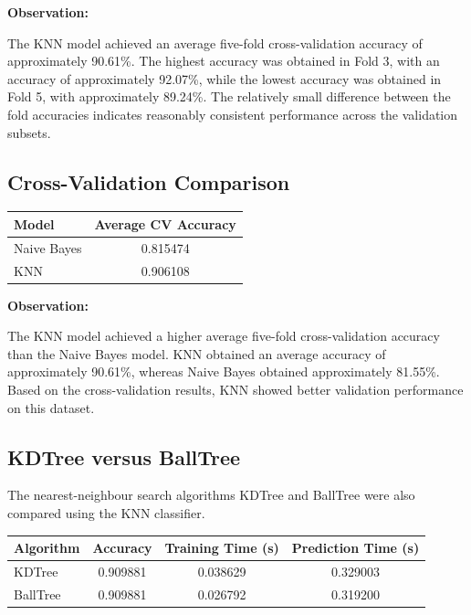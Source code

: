 \documentclass[12pt,a4paper]{article}
\begin{document}
\textbf{Observation:}

The KNN model achieved an average five-fold cross-validation accuracy
of approximately 90.61\%. The highest accuracy was obtained in Fold 3,
with an accuracy of approximately 92.07\%, while the lowest accuracy
was obtained in Fold 5, with approximately 89.24\%. The relatively
small difference between the fold accuracies indicates reasonably
consistent performance across the validation subsets.


\subsection{Cross-Validation Comparison}

\begin{longtable}{|p{5cm}|c|}
\hline
\textbf{Model} & \textbf{Average CV Accuracy} \\ \hline

Naive Bayes & 0.815474 \\ \hline

KNN & 0.906108 \\ \hline

\end{longtable}

\textbf{Observation:}

The KNN model achieved a higher average five-fold cross-validation
accuracy than the Naive Bayes model. KNN obtained an average accuracy
of approximately 90.61\%, whereas Naive Bayes obtained approximately
81.55\%. Based on the cross-validation results, KNN showed better
validation performance on this dataset.


\subsection{KDTree versus BallTree}

The nearest-neighbour search algorithms KDTree and BallTree were also
compared using the KNN classifier.

\begin{longtable}{|p{3.5cm}|c|c|c|}
\hline
\textbf{Algorithm} &
\textbf{Accuracy} &
\textbf{Training Time (s)} &
\textbf{Prediction Time (s)} \\ \hline

KDTree &
0.909881 &
0.038629 &
0.329003 \\ \hline

BallTree &
0.909881 &
0.026792 &
0.319200 \\ \hline

\end{longtable}
\end{document}
